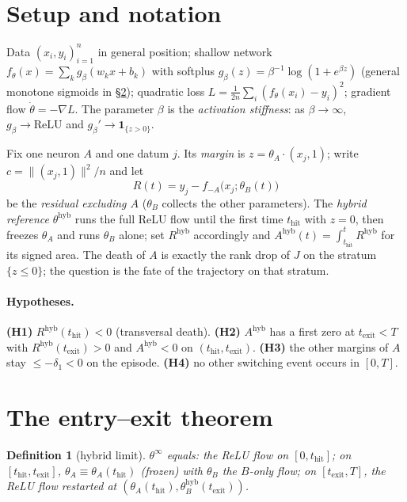 \documentclass[11pt]{article}
\newtheorem{definition}{Definition}
\newcommand{\thit}{t_{\mathrm{hit}}}
\newcommand{\texit}{t_{\mathrm{exit}}}
\begin{document}
\section{Setup and notation}\label{sec:setup}

Data $(x_i,y_i)_{i=1}^n$ in general position; shallow network
$f_\theta(x)=\sum_k g_\beta(w_kx+b_k)$ with softplus
$g_\beta(z)=\beta^{-1}\log(1+e^{\beta z})$ (general monotone sigmoids in
\S\ref{sec:theorem}); quadratic loss
$L=\tfrac1{2n}\sum_i(f_\theta(x_i)-y_i)^2$; gradient flow $\dot\theta=-\nabla L$.
The parameter $\beta$ is the \emph{activation stiffness}: as $\beta\to\infty$,
$g_\beta\to\mathrm{ReLU}$ and $g_\beta'\to\mathbf 1_{\{z>0\}}$.

Fix one neuron $A$ and one datum $j$. Its \emph{margin} is
$z=\theta_A\cdot(x_j,1)$; write $c=\|(x_j,1)\|^2/n$ and let
\[
R(t)=y_j-f_{-A}\bigl(x_j;\theta_B(t)\bigr)
\]
be the \emph{residual excluding $A$} ($\theta_B$ collects the other parameters).
The \emph{hybrid reference} $\theta^{\mathrm{hyb}}$ runs the full ReLU flow until
the first time $\thit$ with $z=0$, then freezes $\theta_A$ and runs $\theta_B$
alone; set $R^{\mathrm{hyb}}$ accordingly and
$A^{\mathrm{hyb}}(t)=\int_{\thit}^t R^{\mathrm{hyb}}$ for its signed area. The
death of $A$ is exactly the rank drop of $J$ on the stratum $\{z\le0\}$; the
question is the fate of the trajectory on that stratum.

\paragraph{Hypotheses.}
\textbf{(H1)} $R^{\mathrm{hyb}}(\thit)<0$ (transversal death).
\textbf{(H2)} $A^{\mathrm{hyb}}$ has a first zero at $\texit<T$ with
$R^{\mathrm{hyb}}(\texit)>0$ and $A^{\mathrm{hyb}}<0$ on $(\thit,\texit)$.
\textbf{(H3)} the other margins of $A$ stay $\le-\delta_1<0$ on the episode.
\textbf{(H4)} no other switching event occurs in $[0,T]$.

\section{The entry--exit theorem}\label{sec:theorem}

\begin{definition}[hybrid limit]\label{def:hybrid}
$\theta^\infty$ equals: the ReLU flow on $[0,\thit]$; on $[\thit,\texit]$,
$\theta_A\equiv\theta_A(\thit)$ (frozen) with $\theta_B$ the $B$-only flow; on
$[\texit,T]$, the ReLU flow restarted at
$(\theta_A(\thit),\theta_B^{\mathrm{hyb}}(\texit))$.
\end{definition}
\end{document}
